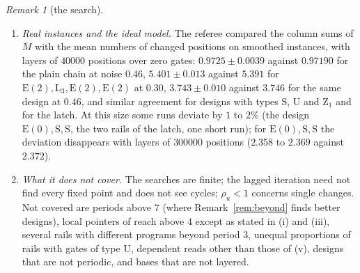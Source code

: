 \documentclass[11pt]{amsart}
\theoremstyle{definition}
\theoremstyle{remark}
\newtheorem{remark}[theorem]{Remark}
\begin{document}
\begin{remark}[the search]
\begin{enumerate}[label=(\roman*),leftmargin=2.4em]
in the last fiftieth of the instance; the gates of a layer come in groups of $m$, and a group
lists $m$ consecutive positions of the layer below, starting at a uniformly random one. Two
copies are evaluated with the same pointers, and in the fourth layer one position in $200$ of the
second copy is flipped. The factor per layer by which the number of positions that differ
changes, from the layer $2$ to the layer $10$ after that one and from the layer $10$ to the layer
$20$, summed over six seeds:
\begin{center}
\begin{tabular}{lccccc}
\toprule
noise & $m=1$ & $m=2$ & $m=3$ & $m=8$ & $m=200000$\\
\midrule
$0.40$ & $1.062$, $1.052$ & $0.963$, $0.975$ & $0.932$, $0.949$ & $0.897$, $0.912$ & $0.877$, $0.895$\\
$0.46$ & $0.967$, $0.980$ & $0.902$, $0.917$ & $0.858$, $0.921$ & $0.836$, $0.864$ & $0.824$, $0.869$\\
\bottomrule
\end{tabular}
\end{center}
The entries are uncertain by about $0.01$; the referee's own simulator gave $0.961$, $0.974$ and
$0.889$, $0.919$ at noise $0.46$ for $m=1$ and $m=2$, and $1.059$, $1.048$ and $0.977$, $0.966$ at
$0.40$. For $m=1$ this is a random block base, and the ideal value is $\lambda=1.079$ and $0.972$;
at noise $0.40$ the differences reach $4\%$ of a layer, where they no longer spread
independently. For $m=200000$ a layer is a shifted copy of the layer below. In this arrangement
gates that list neighbouring positions spread a change less, not more.
\item \emph{Real instances and the ideal model.} The referee compared the column sums of
$\overline M$ with the mean numbers of changed positions on smoothed instances, with layers of
$40000$ positions over zero gates: $0.9725\pm0.0039$ against $0.97190$ for the plain chain at
noise $0.46$, $5.401\pm0.013$ against $5.391$ for $\mathrm E(2),\mathrm L_3,\mathrm E(2),\mathrm E(2)$ at
$0.30$, $3.743\pm0.010$ against $3.746$ for the same design at $0.46$, and similar agreement for
designs with types $\mathrm S$, $\mathrm U$ and $\mathrm Z_1$ and for the latch. At this size some
runs deviate by $1$ to $2\%$ (the design $\mathrm E(0),\mathrm S,\mathrm S$, the two rails of the
latch, one short run); for $\mathrm E(0),\mathrm S,\mathrm S$ the deviation disappears with layers of
$300000$ positions ($2.358$ to $2.369$ against $2.372$).
\item \emph{What it does not cover.} The searches are finite; the lagged iteration need not find
every fixed point and does not see cycles; $\rho_u<1$ concerns single changes. Not covered are
periods above $7$ (where Remark~\ref{rem:beyond} finds better designs), local pointers of reach
above $4$ except as stated in (i) and (iii), several rails with different programs beyond
period $3$, unequal proportions of rails with gates of type $\mathrm U$, dependent reads other than
those of (v), designs that are not periodic, and bases that are not layered.
\end{enumerate}
\end{remark}
\end{document}
